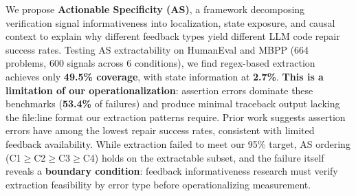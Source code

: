 We propose \textbf{Actionable Specificity (AS)}, a framework decomposing verification signal informativeness into localization, state exposure, and causal context to explain why different feedback types yield different LLM code repair success rates. Testing AS extractability on HumanEval and MBPP (664 problems, 600 signals across 6 conditions), we find regex-based extraction achieves only \textbf{49.5\% coverage}, with state information at \textbf{2.7\%}. \textbf{This is a limitation of our operationalization}: assertion errors dominate these benchmarks (\textbf{53.4\%} of failures) and produce minimal traceback output lacking the file:line format our extraction patterns require. Prior work suggests assertion errors have among the lowest repair success rates, consistent with limited feedback availability. While extraction failed to meet our 95\% target, AS ordering (C1$\geq$C2$\geq$C3$\geq$C4) holds on the extractable subset, and the failure itself reveals a \textbf{boundary condition}: feedback informativeness research must verify extraction feasibility by error type before operationalizing measurement.
